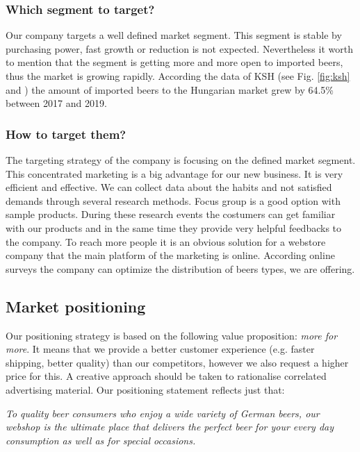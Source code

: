 \subsubsection*{Which segment to target?}

Our company targets a well defined market segment. This segment is stable by purchasing power, fast growth or reduction is not expected. Nevertheless it worth to mention that the segment is getting more and more open to imported beers, thus the market is growing rapidly. According the data of KSH (see Fig. \ref{fig:ksh} and \cite{ksh2}) the amount of imported beers to the Hungarian market grew by 64.5\% between 2017 and 2019.


\subsubsection*{How to target them?}

The targeting strategy of the company is focusing on the defined market segment. This concentrated marketing is a big advantage for our new business. It is very efficient and effective. We can collect data about the habits and not satisfied demands through several research methods.
Focus group is a good option with sample products. During these research events the costumers can get familiar with our products and in the same time they provide very helpful feedbacks to the company. To reach more people it is an obvious solution for a webstore company that the main platform of the marketing is online. According online surveys the company can optimize the distribution of beers types, we are offering.


\subsection{Market positioning}


Our positioning strategy is based on the following value proposition:  \textit{more for more}. It means that we provide a better customer experience (e.g. faster shipping, better quality) than our competitors, however we also request a higher price for this. A creative approach should be taken to rationalise correlated advertising material. Our positioning statement reflects just that:

\textit{To quality beer consumers who enjoy a wide variety of German beers, our webshop is the ultimate place that delivers the perfect beer for your every day consumption as well as for special occasions.}



